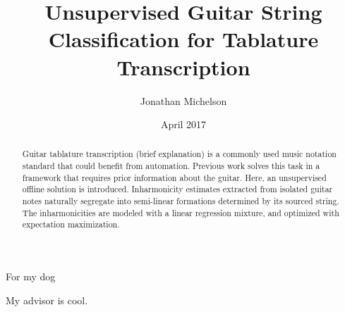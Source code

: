 \documentclass[12pt]{cmuthesis}
\begin{document}
 
\frontmatter

\pagestyle{empty}

\title{ %
{\bf Unsupervised Guitar String Classification for Tablature Transcription}}
\author{Jonathan Michelson}
\date{April 2017}
\trnumber{}


\support{}
\disclaimer{}



\maketitle

\begin{dedication}
For my dog
\end{dedication}

\pagestyle{plain} %


\doublespacing
\begin{abstract}
Guitar tablature transcription (brief explanation) is a commonly used music notation standard that could benefit from automation. Previous work solves this task in a framework that requires prior information about the guitar. Here, an unsupervised offline solution is introduced. Inharmonicity estimates extracted from isolated guitar notes naturally segregate into semi-linear formations determined by its sourced string. The inharmonicities are modeled with a linear regression mixture, and optimized with expectation maximization. 
\end{abstract}
\singlespacing

\begin{acknowledgments}
My advisor is cool.
\end{acknowledgments}



\tableofcontents
\listoffigures
\listoftables

\mainmatter

\end{document}
